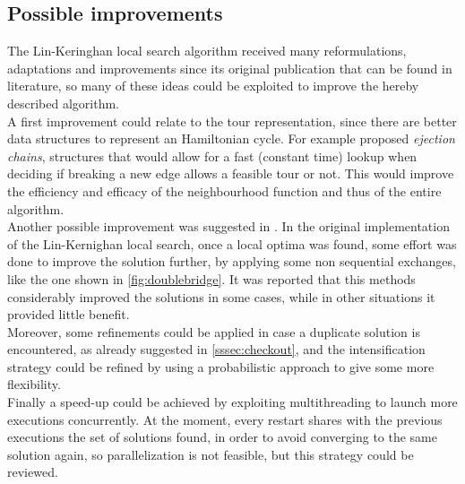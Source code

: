 \subsection{Possible improvements}
The Lin-Keringhan local search algorithm received many reformulations, adaptations and improvements since its original publication that can be found in literature, so many of these ideas could be exploited to improve the hereby described algorithm.\\
A first improvement could relate to the tour representation, since there are better data structures to represent an Hamiltonian cycle. For example \cite{GLOVER1996223} proposed \textit{ejection chains}, structures that would allow for a fast (constant time) lookup when deciding if breaking a new edge allows a feasible tour or not. This would improve the efficiency and efficacy of the neighbourhood function and thus of the entire algorithm. \\
Another possible improvement was suggested in \cite{LinK73}. In the original implementation of the Lin-Kernighan local search, once a local optima was found, some effort was done to improve the solution further, by applying some non sequential exchanges, like the one shown in \cref{fig:doublebridge}. It was reported that this methods considerably improved the solutions in some cases, while in other situations it provided little benefit.\\
Moreover, some refinements could be applied in case a duplicate solution is encountered, as already suggested in \cref{sssec:checkout}, and the intensification strategy could be refined by using a probabilistic approach to give some more flexibility.\\
Finally a speed-up could be achieved by exploiting multithreading to launch more executions concurrently. At the moment, every restart shares with the previous executions the set of solutions found, in order to avoid converging to the same solution again, so parallelization is not feasible, but this strategy could be reviewed.\\


